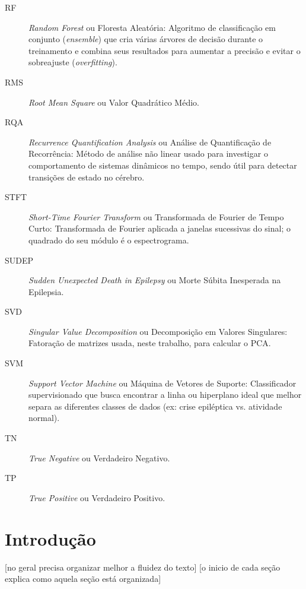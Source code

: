 \documentclass[]{article}
\begin{document}
\begin{description}
		\item[RF] \textit{Random Forest} ou Floresta Aleatória: Algoritmo de classificação em conjunto (\textit{ensemble}) que cria várias árvores de decisão durante o treinamento e combina seus resultados para aumentar a precisão e evitar o sobreajuste (\textit{overfitting}).
		\item[RMS] \textit{Root Mean Square} ou Valor Quadrático Médio.
		\item[RQA] \textit{Recurrence Quantification Analysis} ou Análise de Quantificação de Recorrência: Método de análise não linear usado para investigar o comportamento de sistemas dinâmicos no tempo, sendo útil para detectar transições de estado no cérebro.
		\item[STFT] \textit{Short-Time Fourier Transform} ou Transformada de Fourier de Tempo Curto: Transformada de Fourier aplicada a janelas sucessivas do sinal; o quadrado do seu módulo é o espectrograma.
		\item[SUDEP] \textit{Sudden Unexpected Death in Epilepsy} ou Morte Súbita Inesperada na Epilepsia.
		\item[SVD] \textit{Singular Value Decomposition} ou Decomposição em Valores Singulares: Fatoração de matrizes usada, neste trabalho, para calcular o PCA.
		\item[SVM] \textit{Support Vector Machine} ou Máquina de Vetores de Suporte: Classificador supervisionado que busca encontrar a linha ou hiperplano ideal que melhor separa as diferentes classes de dados (ex: crise epiléptica vs. atividade normal).
		\item[TN] \textit{True Negative} ou Verdadeiro Negativo.
		\item[TP] \textit{True Positive} ou Verdadeiro Positivo.
	\end{description}

	\clearpage
	
	\section{Introdução}
	\label{sec:intro}
	
	[no geral precisa organizar melhor a fluidez do texto]
	[o inicio de cada seção explica como aquela seção está organizada]
	
	\vspace{0.5cm} %
	
	\noindent %
	
\end{document}
